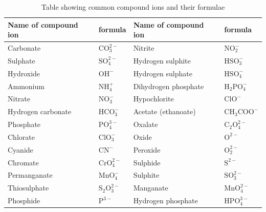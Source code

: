           \begin{table}[H]
        \begin{center}
      \label{m38689*uid99}
    \noindent
      \begin{tabular}{|l|l|l|l|}\hline
                  \textbf{Name of compound ion} &
                  \textbf{formula} &  \textbf{Name of compound ion} & \textbf{formula} \\ \hline
        Carbonate & $\mathrm{CO}_{3}^{2-}$ & Nitrite & $\mathrm{NO}_{2}^{-}$ \\ \hline
        Sulphate &  $\mathrm{SO}_{4}^{2-}$ & Hydrogen sulphite & $\mathrm{HSO}_{3}^{-}$ \\ \hline
        Hydroxide & ${\mathrm{OH}}^{-}$ & Hydrogen sulphate & $\mathrm{HSO}_{4}^{-}$ \\ \hline
        Ammonium & $\mathrm{NH}_{4}^{+}$ & Dihydrogen phosphate & ${\mathrm{H}}_{2}\mathrm{PO}_{4}^{-}$ \\ \hline
        Nitrate & $\mathrm{NO}_{3}^{-}$ & Hypochlorite & ${\mathrm{ClO}}^{-}$ \\ \hline
        Hydrogen carbonate & $\mathrm{HCO}_{3}^{-}$ & Acetate (ethanoate) & ${\mathrm{CH}}_{3}{\mathrm{COO}}^{-}$ \\ \hline
        Phosphate & $\mathrm{PO}_{4}^{3-}$ & Oxalate & ${\mathrm{C}}_{2}\mathrm{O}_{4}^{2-}$ \\ \hline
        Chlorate & $\mathrm{ClO}_{3}^{-}$ &  Oxide & ${\mathrm{O}}^{2-}$ \\ \hline
        Cyanide & ${\mathrm{CN}}^{-}$ & Peroxide & $\mathrm{O}_{2}^{2-}$ \\ \hline
        Chromate & $\mathrm{CrO}_{4}^{2-}$ & Sulphide & ${\mathrm{S}}^{2-}$ \\ \hline
        Permanganate & $\mathrm{MnO}_{4}^{-}$ & Sulphite & $\mathrm{SO}_{3}^{2-}$ \\ \hline
        Thiosulphate & ${\mathrm{S}}_{2}\mathrm{O}_{3}^{2-}$ & Manganate & $\mathrm{MnO}_{4}^{2-}$ \\ \hline
        Phosphide & ${\mathrm{P}}^{3-}$ & Hydrogen phosphate & $\mathrm{HPO}_{4}^{3-}$ \\ \hline
    \end{tabular}
      \end{center}
    \caption{Table showing common compound ions and their formulae}
\end{table}
    \par
